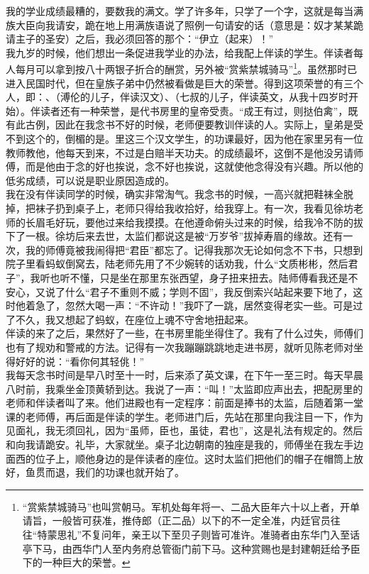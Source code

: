 我的学业成绩最糟的，要数我的满文。学了许多年，只学了一个字，这就是每当满族大臣向我请安，跪在地上用满族语说了照例一句请安的话（意思是：奴才某某跪请主子的圣安）之后，我必须回答的那个：“伊立（起来）！”\\

我九岁的时候，他们想出一条促进我学业的办法，给我配上伴读的学生。伴读者每人每月可以拿到按八十两银子折合的酬赏，另外被“赏紫禁城骑马”\footnote{“赏紫禁城骑马”也叫赏朝马。军机处每年将一、二品大臣年六十以上者，开单请旨，一般皆可获准，推侍郎（正二品）以下的不一定全准，内廷官员往往“特蒙思礼”不复问年，亲王以下至贝子则皆可准许。准骑者由东华门入至话亭下马，由西华门人至内务府总管衙门前下马。这种赏赐也是封建朝廷给予臣下的一种巨大的荣誉。}。虽然那时已进入民国时代，但在皇族子弟中仍然被看做是巨大的荣誉。得到这项荣誉的有三个人，即：、（溥伦的儿子，伴读汉文）、（七叔的儿子，伴读英文，从我十四岁时开始）。伴读者还有一种荣誉，是代书房里的皇帝受责。“成王有过，则挞伯禽”，既有此古例，因此在我念书不好的时候，老师便要教训伴读的人。实际上，皇弟是受不到这个的，倒楣的是。里这三个汉文学生，的功课最好，因为他在家里另有一位教师教他，他每天到来，不过是白赔半天功夫。的成绩最坏，这倒不是他没另请师傅，而是他由于念的好也挨说，念不好也挨说，这就使他念得没有兴趣。所以他的低劣成绩，可以说是职业原因造成的。\\

我在没有伴读同学的时候，确实非常淘气。我念书的时候，一高兴就把鞋袜全脱掉，把袜子扔到桌子上，老师只得给我收拾好，给我穿上。有一次，我看见徐坊老师的长眉毛好玩，要他过来给我摸摸。在他遵命俯头过来的时候，给我冷不防的拔下了一根。徐坊后来去世，太监们都说这是被“万岁爷”拔掉寿眉的缘故。还有一次，我的师傅竟被我闹得把“君臣”都忘了。记得我那次无论如何念不下书，只想到院子里看蚂蚁倒窝去，陆老师先用了不少婉转的话劝我，什么“文质彬彬，然后君子”，我听也听不懂，只是坐在那里东张西望，身子扭来扭去。陆师傅看我还是不安心，又说了什么“君子不重则不威；学则不固”，我反倒索兴站起来要下地了，这时他着急了，忽然大喝一声：“不许动！”我吓了一跳，居然变得老实一些。可是过了不久，我又想起了蚂蚁，在座位上魂不守舍地扭起来。\\

伴读的来了之后，果然好了一些，在书房里能坐得住了。我有了什么过失，师傅们也有了规劝和警戒的方法。记得有一次我蹦蹦跳跳地走进书房，就听见陈老师对坐得好好的说：“看你何其轻佻！”\\

我每天念书时间是早八时至十一时，后来添了英文课，在下午一至三时。每天早晨八时前，我乘坐金顶黄轿到达。我说了一声：“叫！”太监即应声出去，把配房里的老师和伴读者叫了来。他们进殿也有一定程序：前面是捧书的太监，后随着第一堂课的老师傅，再后面是伴读的学生。老师进门后，先站在那里向我注目一下，作为见面礼，我无须回礼，因为“虽师，臣也，虽徒，君也”，这是礼法有规定的。然后和向我请跪安。礼毕，大家就坐。桌子北边朝南的独座是我的，师傅坐在我左手边面西的位子上，顺他身边的是伴读者的座位。这时太监们把他们的帽子在帽筒上放好，鱼贯而退，我们的功课也就开始了。\\

